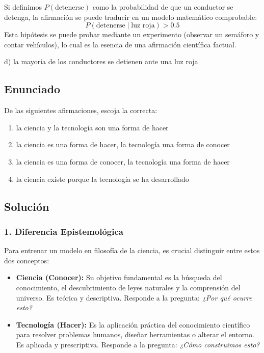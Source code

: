 \documentclass[12pt, a4paper]{article}
\begin{document}
Si definimos $P(\text{detenerse})$ como la probabilidad de que un conductor se detenga, la afirmación se puede traducir en un modelo matemático comprobable:
$$ P(\text{detenerse} \mid \text{luz roja}) > 0.5 $$
Esta hipótesis se puede probar mediante un experimento (observar un semáforo y contar vehículos), lo cual es la esencia de una afirmación científica factual.

\begin{tcolorbox}[colback=green!5!white, colframe=green!50!black, title=Respuesta Final]
\centering \Large d) la mayoría de los conductores se detienen ante una luz roja
\end{tcolorbox}

\newpage


\subsection*{Enunciado}
De las siguientes afirmaciones, escoja la correcta:
\begin{enumerate}[label=\alph*)]
    \item la ciencia y la tecnología son una forma de hacer
    \item la ciencia es una forma de hacer, la tecnología una forma de conocer
    \item la ciencia es una forma de conocer, la tecnología una forma de hacer
    \item la ciencia existe porque la tecnología se ha desarrollado
\end{enumerate}

\subsection*{Solución}

\subsubsection*{1. Diferencia Epistemológica}
Para entrenar un modelo en filosofía de la ciencia, es crucial distinguir entre estos dos conceptos:
\begin{itemize}
    \item \textbf{Ciencia (Conocer):} Su objetivo fundamental es la búsqueda del conocimiento, el descubrimiento de leyes naturales y la comprensión del universo. Es teórica y descriptiva. Responde a la pregunta: \textit{¿Por qué ocurre esto?}
    \item \textbf{Tecnología (Hacer):} Es la aplicación práctica del conocimiento científico para resolver problemas humanos, diseñar herramientas o alterar el entorno. Es aplicada y prescriptiva. Responde a la pregunta: \textit{¿Cómo construimos esto?}
\end{itemize}
\end{document}
